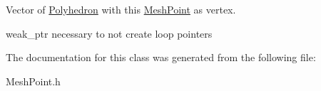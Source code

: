 \-Vector of \hyperlink{class_polyhedron}{\-Polyhedron} with this \hyperlink{class_mesh_point}{\-Mesh\-Point} as vertex. 

weak\-\_\-ptr necessary to not create loop pointers 

\-The documentation for this class was generated from the following file\-:\begin{DoxyCompactItemize}
\item 
\-Mesh\-Point.\-h\end{DoxyCompactItemize}
